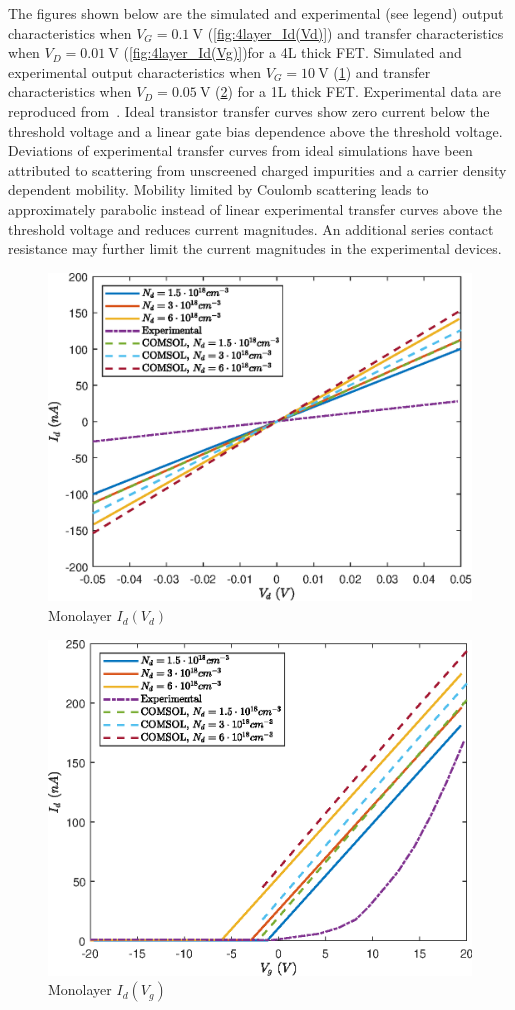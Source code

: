 \documentclass[12pt,a4paper,titlepage]{article}
\begin{document}
The figures shown below are the simulated and experimental (see legend) output characteristics when $V_G = \SI{0.1}{\volt}$ (\ref{fig:4layer_Id(Vd)}) and transfer characteristics when $V_D = \SI{0.01}{\volt}$ (\ref{fig:4layer_Id(Vg)})for a 4L thick FET. Simulated and experimental output characteristics when $V_G = \SI{10}{\volt}$ (\ref{fig:monolayer_Id(Vd)}) and transfer characteristics when $V_D = \SI{0.05}{\volt}$ (\ref{fig:monolayer_Id(Vg)}) for a 1L thick FET. Experimental data are reproduced from~\cite{Wu:Ultrathin_MoS2}. Ideal transistor transfer curves show zero current below the threshold voltage and a linear gate bias dependence above the threshold voltage. Deviations of experimental transfer curves from ideal simulations have been attributed to scattering from unscreened charged impurities and a carrier density dependent mobility. Mobility limited by Coulomb scattering leads to approximately parabolic instead of linear experimental transfer curves above the threshold voltage and reduces current magnitudes. An additional series contact resistance may further limit the current magnitudes in the experimental devices.

\begin{figure}[H]
	\centering
	\includegraphics[width=.8\textwidth]{Grafici/monolayer_Id(Vd).eps} 
	\caption{Monolayer $I_d(V_d)$}
	\label{fig:monolayer_Id(Vd)}
\end{figure}

\begin{figure}[H]
	\centering
	\includegraphics[width=.8\textwidth]{Grafici/monolayer_Id(Vg).eps} 
	\caption{Monolayer $I_d(V_g)$}
	\label{fig:monolayer_Id(Vg)}
\end{figure}
\end{document}
